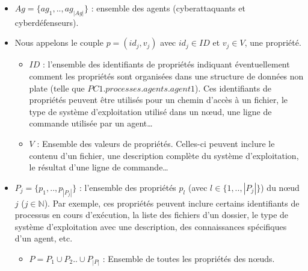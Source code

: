 \begin{itemize}

    \item $Ag = \{ag_1,..,ag_{|Ag|}\}$ : ensemble des agents (cyberattaquants et cyberdéfenseurs).

    \item Nous appelons le couple $p = (id_{j}, v_{j})$ avec $id_j \in {ID}$ et $v_j \in V$, une propriété.
    \begin{itemize}
        \item $ID$ : l'ensemble des identifiants de propriétés indiquant éventuellement comment les propriétés sont organisées dans une structure de données non plate (telle que $PC1.processes.agents.agent1$). Ces identifiants de propriétés peuvent être utilisés pour un chemin d'accès à un fichier, le type de système d'exploitation utilisé dans un nœud, une ligne de commande utilisée par un agent\dots
        \item $V$ : Ensemble des valeurs de propriétés. Celles-ci peuvent inclure le contenu d'un fichier, une description complète du système d'exploitation, le résultat d'une ligne de commande\dots
    \end{itemize}

    \item $P_{j} = \{ p_1, .., p_{|P_{j}|} \}$ : l'ensemble des propriétés $p_{l}$ (avec $l \in \{1,..,|P_{j}|\}$) du nœud $j$ ($j \in \mathbb{N} $). Par exemple, ces propriétés peuvent inclure certains identifiants de processus en cours d'exécution, la liste des fichiers d'un dossier, le type de système d'exploitation avec une description, des connaissances spécifiques d'un agent, etc.
    \begin{itemize}
        \item $P = P_1 \cup P_2 .. \cup P_{|P|} $ : Ensemble de toutes les propriétés des nœuds.
    \end{itemize}


\end{itemize}
